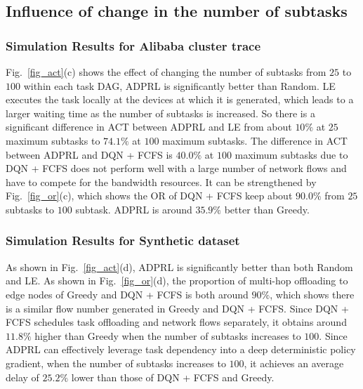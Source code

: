 \documentclass[10pt, conference, letterpaper]{IEEEtran}
\begin{document}

\subsection{Influence of change in the number of subtasks}
\subsubsection{Simulation Results for Alibaba cluster trace}

Fig.~\ref{fig_act}(c) shows the effect of changing the number of subtasks from $25$ to $100$ within each task DAG, ADPRL is significantly better than Random. LE executes the task locally at the devices at which it is generated, which leads to a larger waiting time as the number of subtasks is increased. So there is a significant difference in ACT between ADPRL and LE from about $10\%$ at $25$ maximum subtasks to $74.1\%$ at $100$ maximum subtasks. The difference in ACT between ADPRL and DQN + FCFS is $40.0\%$ at $100$ maximum subtasks due to DQN + FCFS does not perform well with a large number of network flows and have to compete for the bandwidth resources. It can be strengthened by Fig.~\ref{fig_or}(c), which shows the OR of DQN + FCFS keep about $90.0\%$ from $25$ subtasks to $100$ subtask. ADPRL is around $35.9\%$ better than Greedy.

\subsubsection{Simulation Results for Synthetic dataset}

As shown in Fig.~\ref{fig_act}(d), ADPRL is significantly better than both Random and LE. As shown in Fig.~\ref{fig_or}(d), the proportion of multi-hop offloading to edge nodes of Greedy and DQN + FCFS is both around $90\%$, which shows there is a similar flow number generated in Greedy and DQN + FCFS. Since DQN + FCFS schedules task offloading and network flows separately, it obtains around $11.8\%$ higher than Greedy when the number of subtasks increases to $100$. Since ADPRL can effectively leverage task dependency into a deep deterministic policy gradient, when the number of subtasks increases to $100$, it achieves an average delay of $25.2\%$ lower than those of DQN + FCFS and Greedy. 
\end{document}
